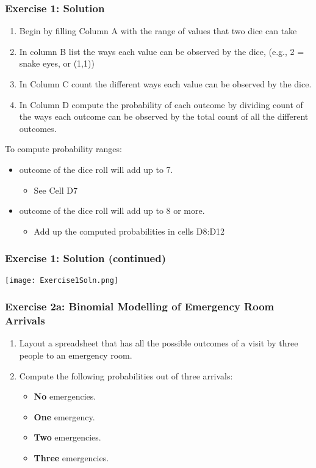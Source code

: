\documentclass[12pt]{beamer}
\begin{document}
	\begin{frame}
		\frametitle{Exercise 1: Solution}
		\begin{enumerate} 
			\item Begin by filling Column A with the range of values that two dice can take
			\item In column B list the ways each value can be observed by the dice, (e.g., 2 = snake eyes, or (1,1)) 
			\item In Column C count the different ways each value can be observed by the dice.
			\item In Column D compute the probability of each outcome by dividing count of the ways each outcome can be observed by the total count of all the different outcomes.
		\end{enumerate}			
		To compute probability ranges:
		\begin{itemize}
			\item  outcome of the dice roll will add up to 7.
			\begin{itemize}
				\item See Cell D7
			\end{itemize}
			\item outcome of the dice roll will add up to 8 or more.
			\begin{itemize}
				\item Add up the computed probabilities in cells D8:D12
			\end{itemize}
		\end{itemize}
	\end{frame}
	\begin{frame}
		\frametitle{Exercise 1: Solution (continued)}
		\begin{center}
			\texttt{[image: Exercise1Soln.png]}
		\end{center}
	\end{frame}
	\begin{frame}
		\frametitle{Exercise 2a: Binomial Modelling of Emergency Room Arrivals}
		\begin{enumerate}
			\item Layout a spreadsheet that has all the possible outcomes of a visit by three people to an emergency room.
			\item Compute the following probabilities out of three arrivals:
			\begin{itemize}
				\item \textbf{No} emergencies.
				\item \textbf{One} emergency.
				\item \textbf{Two} emergencies.
				\item \textbf{Three} emergencies.
			\end{itemize}
		\end{enumerate}
	\end{frame}
\end{document}

